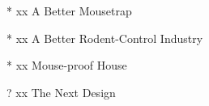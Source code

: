 *	xx  A Better Mousetrap   %

* 	xx  A Better Rodent-Control Industry   %

*	xx  Mouse-proof House   %

?	xx  The Next Design   %
